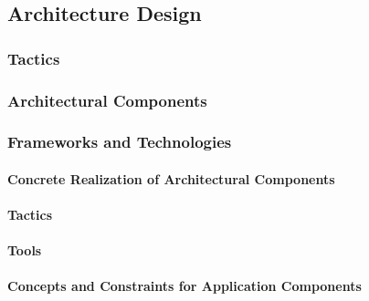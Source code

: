 \subsection{Architecture Design}
\subsubsection{Tactics}
\subsubsection{Architectural Components}
\subsubsection{Frameworks and Technologies}
\paragraph{Concrete Realization of Architectural Components}
\paragraph{Tactics}
\paragraph{Tools}
\paragraph{Concepts and Constraints for Application Components}